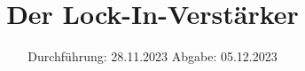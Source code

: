 

\subject{VERSUCH 303}
\title{Der Lock-In-Verstärker}
\date{%
  Durchführung: 28.11.2023
  \hspace{3em}
  Abgabe: 05.12.2023
}



\maketitle
\thispagestyle{empty}
\tableofcontents
\newpage






\printbibliography{}


